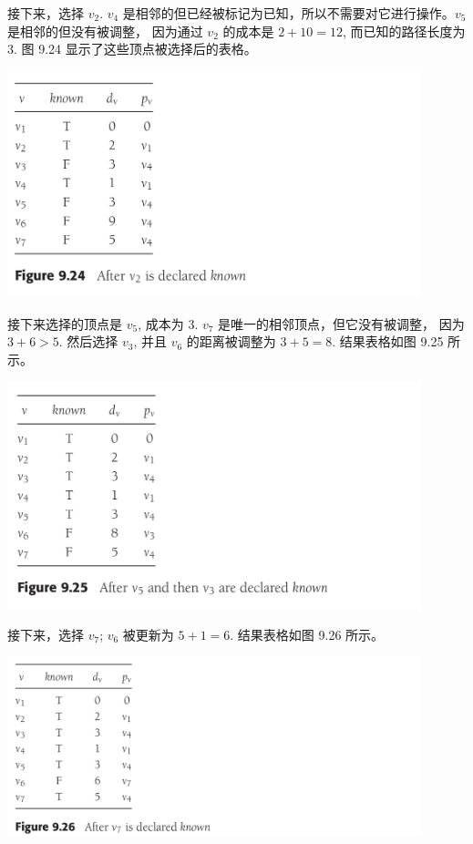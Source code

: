 \documentclass[a4paper]{ctexart}
\theoremstyle{definition}
\theoremstyle{definition}
\begin{document}
接下来，选择 \( v_2 \). \( v_4 \) 是相邻的但已经被标记为已知，所以不需要对它进行操作。\( v_5 \) 是相邻的但没有被调整，
因为通过 \( v_2 \) 的成本是 \( 2 + 10 = 12 \), 而已知的路径长度为 $3$. 图 9.24 显示了这些顶点被选择后的表格。

\begin{center}
  \includegraphics[width=0.9\textwidth]{images/FIG9_24.png}
\end{center}

接下来选择的顶点是 \( v_5 \), 成本为 $3$. \( v_7 \) 是唯一的相邻顶点，但它没有被调整，
因为 \( 3+6 > 5 \). 然后选择 \( v_3 \), 并且 \( v_6 \) 的距离被调整为 \( 3+5=8 \). 结果表格如图 9.25 所示。

\begin{center}
  \includegraphics[width=0.9\textwidth]{images/FIG9_25.png}
\end{center}

接下来，选择 \( v_7 \); \( v_6 \) 被更新为 \( 5+1=6 \). 结果表格如图 9.26 所示。

\begin{center}
  \includegraphics[width=0.9\textwidth]{images/FIG9_26.png}
\end{center}
\end{document}
